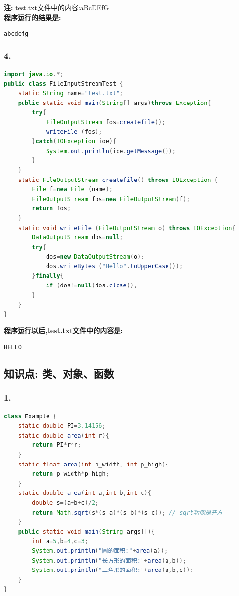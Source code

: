 \documentclass[a4paper,12pt]{article}
\begin{document}
\textbf{注:} test.txt文件中的内容:aBcDEfG \\
\textbf{程序运行的结果是:}
\begin{lstlisting}[style=output]
abcdefg
\end{lstlisting}

\subsubsection{4.}

\begin{lstlisting}[language=Java, caption=FileOutputStream写入文件]
import java.io.*;
public class FileInputStreamTest {
    static String name="test.txt";
    public static void main(String[] args)throws Exception{
        try{
            FileOutputStream fos=createfile();
            writeFile (fos);
        }catch(IOException ioe){
            System.out.println(ioe.getMessage());
        }
    }
    static FileOutputStream createfile() throws IOException {
        File f=new File (name);
        FileOutputStream fos=new FileOutputStream(f);
        return fos;
    }
    static void writeFile (FileOutputStream o) throws IOException{
        DataOutputStream dos=null;
        try{
            dos=new DataOutputStream(o);
            dos.writeBytes ("Hello".toUpperCase());
        }finally{
            if (dos!=null)dos.close();
        }
    }
}
\end{lstlisting}

\textbf{程序运行以后,test.txt文件中的内容是:}
\begin{lstlisting}[style=output]
HELLO
\end{lstlisting}

\subsection{知识点: 类、对象、函数}

\subsubsection{1.}

\begin{lstlisting}[language=Java, caption=方法重载示例]
class Example {
    static double PI=3.14156;
    static double area(int r){
        return PI*r*r;
    }
    static float area(int p_width, int p_high){
        return p_width*p_high;
    }
    static double area(int a,int b,int c){
        double s=(a+b+c)/2;
        return Math.sqrt(s*(s-a)*(s-b)*(s-c)); // sqrt功能是开方
    }
    public static void main(String args[]){
        int a=5,b=4,c=3;
        System.out.println("圆的面积:"+area(a));
        System.out.println("长方形的面积:"+area(a,b));
        System.out.println("三角形的面积:"+area(a,b,c));
    }
}
\end{lstlisting}
\end{document}
